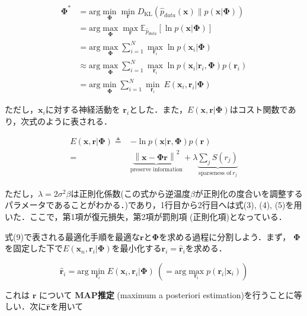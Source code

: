 \begin{align}
\mathbf{\Phi}^*&=\text{arg} \min_{\mathbf{\Phi}} \min_{\mathbf{r}} D_{\text{KL}}\left(\hat{p}_{data}(\mathbf{x}) \| p(\mathbf{x}|\mathbf{\Phi})\right)\\
&=\text{arg} \max_{\mathbf{\Phi}} \max_{\mathbf{r}} \mathbb{E}_{\hat{p}_{data}} \left[\ln p(\mathbf{x}|\mathbf{\Phi})\right]\\
&= \text{arg} \max_{\mathbf{\Phi}}\sum_{i=1}^N \max_{\mathbf{r}_i} \ln p(\mathbf{x}_i|\mathbf{\Phi})\\
&\approx \text{arg} \max_{\mathbf{\Phi}}\sum_{i=1}^N \max_{\mathbf{r}_i} \ln p(\mathbf{x}_i|\mathbf{r}_i, \mathbf{\Phi})p(\mathbf{r}_i)\\
&=\text{arg}\min_{\mathbf{\Phi}} \sum_{i=1}^N \min_{\mathbf{r}_i}\ E(\mathbf{x}_i, \mathbf{r}_i|\mathbf{\Phi})
\end{align}


ただし，$\mathbf{x}_i$に対する神経活動を $\mathbf{r}_i$とした．また，$E(\mathbf{x}, \mathbf{r}|\mathbf{\Phi})$はコスト関数であり，次式のように表される．


\begin{align}
E(\mathbf{x}, \mathbf{r}|\mathbf{\Phi})\triangleq&-\ln p(\mathbf{x}|\mathbf{r}, \mathbf{\Phi})p(\mathbf{r})\\
=&\underbrace{\left\|\mathbf{x}-\mathbf{\Phi} \mathbf{r}\right\|^2}_{\text{preserve information}} + \lambda \underbrace{\sum_j S\left(r_j\right)}_{\text{sparseness of}\ r_j}
\end{align}


ただし，$\lambda=2\sigma^2\beta$は正則化係数(この式から逆温度$\beta$が正則化の度合いを調整するパラメータであることがわかる．)であり，1行目から2行目へは式(3), (4), (5)を用いた．ここで，第1項が復元損失，第2項が罰則項 (正則化項)となっている．

式(9)で表される最適化手順を最適な$\mathbf{r}$と$\mathbf{\Phi}$を求める過程に分割しよう．まず， $\mathbf{\Phi}$を固定した下で$E(\mathbf{x}_n, \mathbf{r}_i|\mathbf{\Phi})$を最小化する$\mathbf{r}_i=\hat{\mathbf{r}}_i$を求める．


\begin{equation}
\hat{\mathbf{r}}_i=\text{arg}\min_{\mathbf{r}_i}E(\mathbf{x}_i, \mathbf{r}_i|\mathbf{\Phi})\ \left(= \text{arg}\max_{\mathbf{r}_i}p(\mathbf{r}_i|\mathbf{x}_i)\right)
\end{equation}


これは $\mathbf{r}$ について \textbf{MAP推定} (maximum a posteriori estimation)を行うことに等しい．次に$\hat{\mathbf{r}}$を用いて


